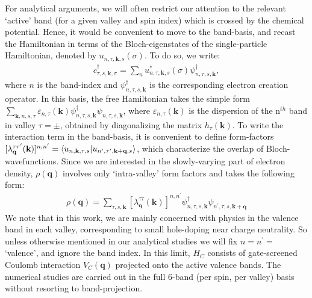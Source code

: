 \documentclass[aps,pra,twocolumn,superscriptaddress,10pt,article,nofootinbib,showpacs,longbibliography]{revtex4-1}
\def \k{{\mathbf k}}
\def \q{{\mathbf q}}
\def \beq{\begin{eqnarray}}
\def \eeq{\end{eqnarray}}
\begin{document}
For analytical arguments, we will often restrict our attention to the relevant `active' band (for a given valley and spin index) which is crossed by the chemical potential.
Hence, it would be convenient to move to the band-basis, and recast the Hamiltonian in terms of the Bloch-eigenstates of the single-particle Hamiltonian, denoted by $u_{n,\tau, \k, s}(\sigma)$. 
To do so, we write:  
\beq
c^\dagger_{\tau,s,\k, \sigma} = \sum_{n} u^*_{n,\tau, \k, s}(\sigma) \psi^\dagger_{n,\tau,s,\k},
\eeq 
where $n$ is the band-index and $\psi^\dagger_{n,\tau,s,\k}$ is the corresponding electron creation operator.
In this basis, the free Hamiltonian takes the simple form $\sum_{\k,n,s,\tau} \varepsilon_{n,\tau}(\k) \psi^\dagger_{n,\tau,s,\k} \psi_{n,\tau,s,\k}$, where $\varepsilon_{n,\tau}(\k)$ is the dispersion of the n$^{th}$ band in valley $\tau = \pm$, obtained by diagonalizing the matrix $h_{\tau}(\k)$.
To write the interaction term in the band-basis, it is convenient to define form-factors $[\lambda^{\tau \tau^\prime}_{\q}(\k)]^{n,n^\prime} = \bra{u_{n,\k,\tau,s}} \ket{u_{n^\prime, \tau^\prime, \k + \q, s}}$, which characterize the overlap of Bloch-wavefunctions.
Since we are interested in the slowly-varying part of electron density, $\rho(\q)$ involves only `intra-valley' form factors and takes the following form:
\beq
\rho(\q) = \sum_{\tau, s, \k} [\lambda^{\tau \tau}_{\q}(\k)]^{n,n^\prime} \psi^\dagger_{n,\tau, s, \k} \psi_{n^\prime,\tau, s, \k + \q}
\eeq
We note that in this work, we are mainly concerned with physics in the valence band in each valley, corresponding to small hole-doping near charge neutrality.
So unless otherwise mentioned in our analytical studies we will fix $n = n^\prime = $ `valence', and ignore the band index.
In this limit, $H_C$ consists of gate-screened Coulomb interaction $V_C(\q)$ projected onto the active valence bands.
The numerical studies are carried out in the full 6-band (per spin, per valley) basis without resorting to band-projection.
\end{document}
